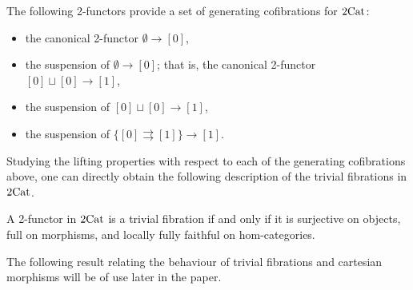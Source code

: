 \documentclass[11pt, dvipsnames]{amsart}
\begin{document}
		\begin{notation}\label{Def:Lackgeneratingcofibs}
			The following 2-functors provide a set of generating cofibrations for $2\mathrm{Cat}$:
			\begin{itemize}
				\item \label{Def:Lackgeneratingcofibs.1}
				the canonical 2-functor $\emptyset \to [0]$, 
				
				\item \label{Def:Lackgeneratingcofibs.2}
				the suspension of $\emptyset \to [0]$; that is, the canonical 2-functor $[0]\sqcup[0]\to [1]$,
				
				\item \label{Def:Lackgeneratingcofibs.3} the
				suspension of $[0]\sqcup[0]\to [1]$,  
				\item \label{Def:Lackgeneratingcofibs.4}
				the suspension of $\{[0] \rightrightarrows [1]\} \to [1]$.
			\end{itemize}
		\end{notation}

	Studying the lifting properties with respect to each of the generating cofibrations above, one can directly obtain the following description of the trivial fibrations in $2\mathrm{Cat}$.

        \begin{prop}\label{char:lacktrivfibs}
            A 2-functor in $2\mathrm{Cat}$ is a trivial fibration if and only if it is surjective on objects, full on morphisms, and locally fully faithful on hom-categories.
        \end{prop}

	The following result relating the behaviour of trivial fibrations and cartesian morphisms will be of use later in the paper. 
\end{document}
